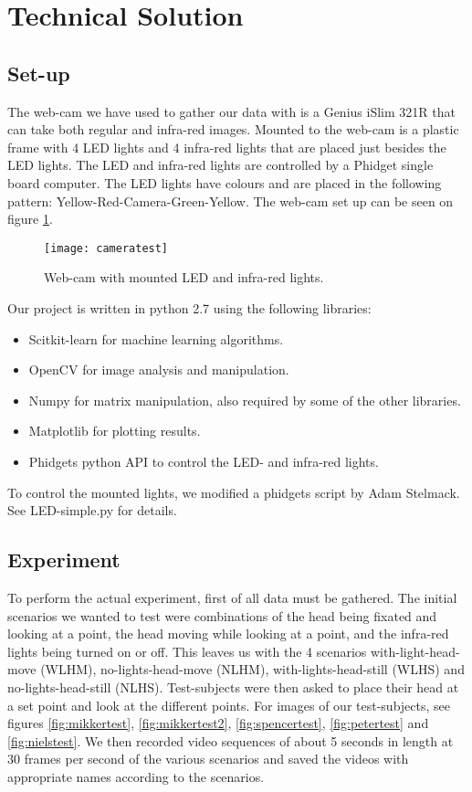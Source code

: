 \section{Technical Solution}
\label{sec:TechnicalSolution}
\subsection{Set-up}
\label{sub:Set-up}
The web-cam we have used to gather our data with is a Genius iSlim 321R that can take both regular and infra-red images.
Mounted to the web-cam is a plastic frame with 4 LED lights and 4 infra-red lights that are placed just besides the LED lights.
The LED and infra-red lights are controlled by a Phidget single board computer. %
The LED lights have colours and are placed in the following pattern: Yellow-Red-Camera-Green-Yellow.
The web-cam set up can be seen on figure \ref{fig:webcam}.
\begin{figure}
\centering
\texttt{[image: cameratest]}
\caption{Web-cam with mounted LED and infra-red lights.}
\label{fig:webcam}
\end{figure}

Our project is written in python 2.7 using the following libraries: 
\begin{itemize} %
\item{Scitkit-learn for machine learning algorithms.}
\item{OpenCV for image analysis and manipulation.}
\item{Numpy for matrix manipulation, also required by some of the other libraries.}
\item{Matplotlib for plotting results.}
\item{Phidgets python API to control the LED- and infra-red lights.}
\end{itemize}

To control the mounted lights, we modified a phidgets script by Adam Stelmack. See LED-simple.py for details. %

\subsection{Experiment}
\label{sub:Experiment}
To perform the actual experiment, first of all data must be gathered.
The initial scenarios we wanted to test were combinations of the head being fixated and looking at a point, the head moving while looking at a point, and the infra-red lights being turned on or off.
This leaves us with the 4 scenarios with-light-head-move (WLHM), no-lights-head-move (NLHM), with-lights-head-still (WLHS) and no-lights-head-still (NLHS).
Test-subjects were then asked to place their head at a set point and look at the different points. For images of our test-subjects, see figures \ref{fig:mikkertest}, \ref{fig:mikkertest2}, \ref{fig:spencertest}, \ref{fig:petertest} and \ref{fig:nielstest}.
We then recorded video sequences of about 5 seconds in length at 30 frames per second of the various scenarios and saved the videos with appropriate names according to the scenarios.

